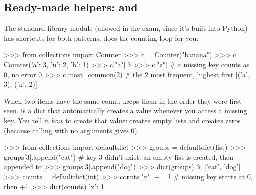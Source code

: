 \documentclass[10pt,a4paper]{article}
\begin{document}
\subsection{Ready-made helpers:  and }
The standard library module  (allowed in the exam, since it’s built into Python) has shortcuts for both patterns.
 does the counting loop for you:
\begin{txtcode}
>>> from collections import Counter
>>> c = Counter("banana")
>>> c
Counter({'a': 3, 'n': 2, 'b': 1})
>>> c["a"]
3
>>> c["z"]                   # a missing key counts as 0, no error
0
>>> c.most_common(2)         # the 2 most frequent, highest first
[('a', 3), ('n', 2)]
\end{txtcode}
When two items have the same count,  keeps them in the order they were first seen.
 is a dict that automatically creates a value whenever you access a missing key. You tell it \emph{how} to create that value:  creates empty lists and  creates zeros (because calling  with no arguments gives 0).
\begin{txtcode}
>>> from collections import defaultdict
>>> groups = defaultdict(list)
>>> groups[3].append("cat")       # key 3 didn't exist: an empty list is created, then appended to
>>> groups[3].append("dog")
>>> dict(groups)
{3: ['cat', 'dog']}
>>> counts = defaultdict(int)
>>> counts["x"] += 1              # missing key starts at 0, then +1
>>> dict(counts)
{'x': 1}
\end{txtcode}
\end{document}
